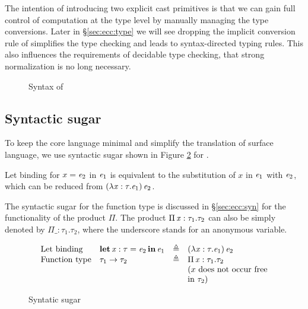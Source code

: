The intention of introducing two explicit cast primitives is that we can gain full control of computation at the type level by manually managing the type conversions. Later in \S \ref{sec:ecc:type} we will see dropping the implicit conversion rule of \cc simplifies the type checking and leads to syntax-directed typing rules. This also influences the requirements of decidable type checking, that strong normalization is no long necessary.

\begin{figure}[ht]
	\gram{\ottee\ottinterrule
		\otts\ottinterrule
		\ottG\ottinterrule
		\ottv}
	\caption{Syntax of \expcc}
	\label{fig:ecc:syntax}
\end{figure}

\subsection{Syntactic sugar}

To keep the core language minimal and simplify the translation of surface language, we use syntactic sugar shown in Figure \ref{fig:ecc:sugar} for \expcc.

Let binding for $x=\mathit{e_{{\mathrm{2}}}}$ in $\mathit{e_{{\mathrm{1}}}}$ is equivalent to the substitution of $x$ in $\mathit{e_{{\mathrm{1}}}}$ with $\mathit{e_{{\mathrm{2}}}}$, which can be reduced from $(  \lambda  \mathit{x}  :  \tau  .  \mathit{e_{{\mathrm{1}}}}  ) \, \mathit{e_{{\mathrm{2}}}}$.

The syntactic sugar for the function type is discussed in \S \ref{sec:ecc:syn} for the functionality of the product $ \Pi $. The product $\Pi \, \mathit{x}  :  \tau_{{\mathrm{1}}}  .  \tau_{{\mathrm{2}}}$ can also be simply denoted by $ \Pi  \_ : \tau_{{\mathrm{1}}} . \tau_{{\mathrm{2}}}$, where the underscore stands for an anonymous variable.

\begin{figure}[ht]
	\centering
	\[
	\begin{array}{llll}
	\text{Let binding} & \mathbf{let} \, \mathit{x}  :  \tau  =  \mathit{e_{{\mathrm{2}}}} \, \mathbf{in} \, \mathit{e_{{\mathrm{1}}}} & \triangleq & (  \lambda  \mathit{x}  :  \tau  .  \mathit{e_{{\mathrm{1}}}}  ) \, \mathit{e_{{\mathrm{2}}}} \\
	\text{Function type} & \tau_{{\mathrm{1}}}  \rightarrow  \tau_{{\mathrm{2}}} & \triangleq & \Pi \, \mathit{x}  :  \tau_{{\mathrm{1}}}  .  \tau_{{\mathrm{2}}}\\
	&&& \text{($x$ does not occur free}\\
	&&& \text{in $\tau_{{\mathrm{2}}}$)}
	\end{array}
	\]
	\caption{Syntatic sugar}
	\label{fig:ecc:sugar}
\end{figure}

